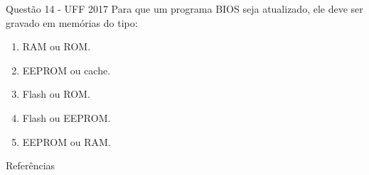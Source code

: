 \documentclass[aspectratio=169,
				xcolor=table]{beamer}
\begin{document}
	\begin{frame}{Questão 14 - UFF 2017}
		Para que um programa BIOS seja atualizado, ele deve ser gravado em memórias do tipo: 
		\begin{enumerate}[a]
			\item RAM ou ROM.
			\item EEPROM ou cache. 
			\item Flash ou ROM.
			\item Flash ou EEPROM.
			\item  EEPROM ou RAM. 			
		\end{enumerate}
	\end{frame}
	
	\begin{frame}{Referências}
		\nocite{Englander2011}
		\nocite{Paixao2014}
		\nocite{Stallings2010}
    	
    	 			
	\end{frame}	
	
	\begin{frame}{}
	\end{frame}
	
\end{document}
